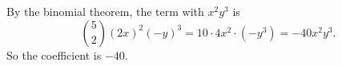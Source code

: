 By the binomial theorem, the term with $x^2y^3$ is
\[
\binom{5}{2}(2x)^2(-y)^3=10\cdot4x^2\cdot(-y^3)=-40x^2y^3 .
\]
So the coefficient is $\boxed{-40}$.
